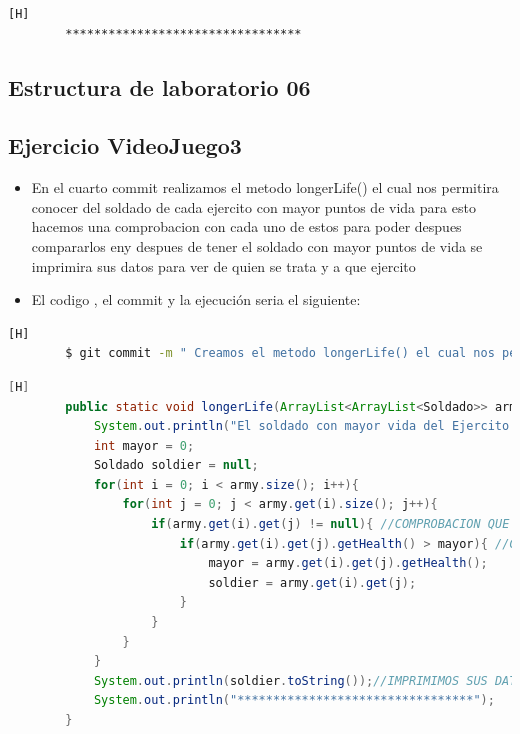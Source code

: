 \documentclass{article}
\begin{document}
\begin{lstlisting}[language=bash,caption={La ejecución: \textcolor{red}{PARA PODER VER LA TABLA COMPLETAMENTE MIRAR LA PLANTILLA DE LATEX O EJECUTARLO: }}][H]
		*********************************
	\end{lstlisting}
	\subsection{Estructura de laboratorio 06}
	\subsection{Ejercicio VideoJuego3}
	\begin{itemize}	
		\item En el cuarto commit realizamos el metodo longerLife() el cual nos permitira conocer del soldado de cada ejercito con mayor puntos de vida para esto hacemos una comprobacion con cada uno de estos para poder despues compararlos eny despues de tener el soldado con mayor puntos de vida se imprimira sus datos para ver de quien se trata y a que ejercito
		\item El codigo , el commit  y la ejecución seria el siguiente:
	\end{itemize}	
	\begin{lstlisting}[language=bash,caption={Commit}][H]
		$ git commit -m " Creamos el metodo longerLife() el cual nos permitira conocer del soldado de cada ejercito con mayor puntos de vida para esto hacemos una comprobacion con cada uno de estos para poder despues compararlos eny despues de tener el soldado con mayor puntos de vida se imprimira sus datos para ver de quien se trata y a que ejercito
	\end{lstlisting}	
	\begin{lstlisting}[language=java,caption={Las lineas de codigos del metodo creado:}][H]
		public static void longerLife(ArrayList<ArrayList<Soldado>> army, int num){
			System.out.println("El soldado con mayor vida del Ejercito " + num + " es: "); //METODO CREADO PARA PODER PERMITIRNOS A CONOCER EL SOLDADO CON MAYOR VIDA DE CADA EJERCITO 
			int mayor = 0;
			Soldado soldier = null;
			for(int i = 0; i < army.size(); i++){
				for(int j = 0; j < army.get(i).size(); j++){
					if(army.get(i).get(j) != null){ //COMPROBACION QUE HACEMOS PARA PODER DECIR QUE EL CASILLERO DONDE ESTAMOS ES UN SOLDADO QUE EXISTE
						if(army.get(i).get(j).getHealth() > mayor){ //COMPARAMOS PUNTOS DE VIDA DE CADA SOLDADO PARA VER QUIEN ES EL MAYOR 
							mayor = army.get(i).get(j).getHealth();
							soldier = army.get(i).get(j);
						}
					}
				}
			}
			System.out.println(soldier.toString());//IMPRIMIMOS SUS DATOS PARA PODER VER DE QUE SOLDADO SE TRATA 
			System.out.println("*********************************");
		}
	\end{lstlisting}
\end{document}
